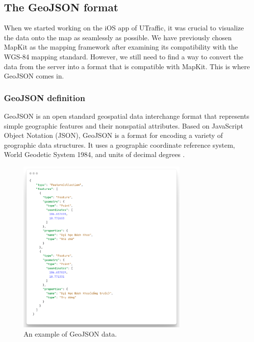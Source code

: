 \subsection{The GeoJSON format}

When we started working on the iOS app of UTraffic, it was crucial to visualize the data onto the map as seamlessly as possible. We have previously chosen MapKit as the mapping framework after examining its compatibility with the WGS-84 mapping standard. However, we still need to find a way to convert the data from the server into a format that is compatible with MapKit. This is where GeoJSON comes in.

\subsubsection{GeoJSON definition}

GeoJSON is an open standard geospatial data interchange format that represents simple geographic features and their nonspatial attributes. Based on JavaScript Object Notation (JSON), GeoJSON is a format for encoding a variety of geographic data structures. It uses a geographic coordinate reference system, World Geodetic System 1984, and units of decimal degrees \cite{geojsonarcgis}. 

\begin{figure}[H]
    \centering
    \includegraphics[width=0.75\textwidth]{assets/images/Research/geojson/example_geojson.png}
    \caption{An example of GeoJSON data.}
    \label{fig:geojson_example}
\end{figure}

